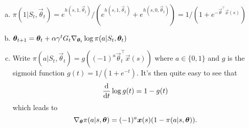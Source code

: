 \begin{enumerate}[a)]
    \item $\pi(1 \vert{} S_t, \vec{\theta}_t) = e^{h(s, 1, \vec{\theta}_t)} / (e^{h(s, 1, \vec{\theta}_t)} + e^{h(s, 0, \vec{\theta}_t)}) = 1 /(1 + e^{-\vec{\theta}^\top\vec{x}(s)}) $
    \item $\boldsymbol{\theta}_{t+1} = \boldsymbol{\theta}_t + \alpha \gamma^t G_t \nabla_{\boldsymbol{\theta}_t}\log\pi(a \vert{} S_t, \boldsymbol{\theta}_t)$ 
    \item Write $\pi(a \vert{} S_t, \vec{\theta}_t) = g((-1)^a \vec{\theta}_t^\top\vec{x}(s))$ where $a \in \{ 0, 1\}$ and $g$ is the sigmoid function $g(t) = 1 / (1 + e^{-t})$. It's then quite easy to see that 
    \[
        \frac{\mathrm{d}{}}{\mathrm{d}{} t} \log g(t) = 1 - g(t)
    \]
    which leads to
    \[
        \nabla_{\boldsymbol{\theta}} \pi(a \vert{} s, \boldsymbol{\theta}) = (-1)^a \boldsymbol{x}(s) (1 - \pi(a \vert{} s, \boldsymbol{\theta})).
    \]
\end{enumerate}
